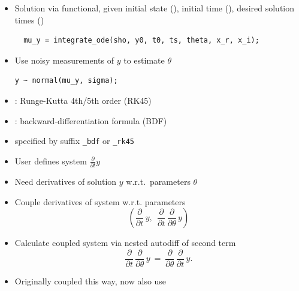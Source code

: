 \documentclass[10pt]{report}
\begin{document}
%
\begin{itemize}
\item Solution via functional, given initial state (),
initial time (), desired solution times ()
{\footnotesize
\begin{Verbatim}
  mu_y = integrate_ode(sho, y0, t0, ts, theta, x_r, x_i);
\end{Verbatim}
}
\item Use noisy measurements of $y$ to estimate $\theta$
\begin{Verbatim}
y ~ normal(mu_y, sigma);
\end{Verbatim}
\end{itemize}


%
\begin{itemize}
\item {}: Runge-Kutta 4th/5th order (RK45)
\item {}:  backward-differentiation formula (BDF)
\item specified by suffix \Verb|_bdf| or \Verb|_rk45|
\end{itemize}


%
\begin{itemize}
\item User defines system $\frac{\partial}{\partial t} y$
\item Need derivatives of solution $y$ w.r.t.\ parameters $\theta$
\item Couple derivatives of system  w.r.t. parameters
\[
\left(
\frac{\partial}{\partial t} \, y, \ \
\frac{\partial}{\partial t} \, \frac{\partial}{\partial \theta} \, y
\right)
\]
\item Calculate coupled system via nested autodiff of second term
\[
\frac{\partial}{\partial t} \, \frac{\partial}{\partial \theta} \, y
\ = \
\frac{\partial}{\partial \theta} \, \frac{\partial}{\partial t} \, y.
\]
\item Originally coupled this way, now also use 
\end{itemize}
\end{document}
